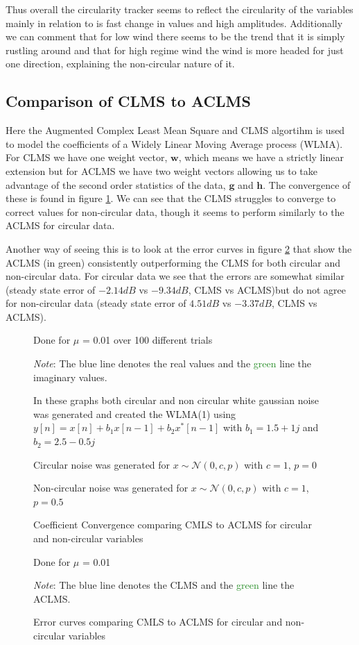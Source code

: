 \documentclass[10pt,twoside,a4paper]{report}
\begin{document}
Thus overall the circularity tracker seems to reflect the circularity of the variables mainly in relation to is fast change in values and high amplitudes. Additionally we can comment that for low wind there seems to be the trend that it is simply rustling around and that for high regime wind the wind is more headed for just one direction, explaining the non-circular nature of it.
\FloatBarrier
\subsection{Comparison of CLMS to ACLMS}
Here the Augmented Complex Least Mean Square and CLMS algortihm is used to model the coefficients of a Widely Linear Moving Average process (WLMA). For CLMS we have one weight vector, $\mathbf{w}$, which means we have a strictly linear extension but for ACLMS we have two weight vectors allowing us to take advantage of the second order statistics of the data, $\mathbf{g}$ and $\mathbf{h}$. The convergence of these is found in figure \ref{fig:4_2f_2}. We can see that the CLMS struggles to converge to correct values for non-circular data, though it seems to perform similarly to the ACLMS for circular data.

Another way of seeing this is to look at the error curves in figure \ref{fig:4_2f_1} that show the ACLMS (in green) consistently outperforming the CLMS for both circular and non-circular data. For circular data we see that the errors are somewhat similar (steady state error of $-2.14dB$ vs $-9.34dB$, CLMS vs ACLMS)but do not agree for non-circular data (steady state error of $4.51dB$ vs $-3.37dB$, CLMS vs ACLMS).

\begin{figure}[h]
\centering
\resizebox{\textwidth}{!}{}
\resizebox{\textwidth}{!}{}
Done for $\mu$ = 0.01  over 100 different trials

\justifying

\textit{Note}: The \textcolor{NavyBlue}{blue} line denotes the real values and the \textcolor{ForestGreen}{green} line the imaginary values.

In these graphs both circular and non circular white gaussian noise was generated and created the WLMA(1) using $y[n]=x[n]+b_1x[n-1]+b_2x^*[n-1]$ with $b_1=1.5+1j$ and $b_2 = 2.5-0.5j$

Circular noise was generated for $x\sim \mathcal{N}(0,c,p)$ with $c=1$, $p=0$

Non-circular noise was generated for $x\sim \mathcal{N}(0,c,p)$ with $c=1$, $p=0.5$
\caption{Coefficient Convergence comparing CMLS to ACLMS for circular and non-circular variables}
\label{fig:4_2f_2}
\end{figure}
\begin{figure}[h]
\centering
\resizebox{\textwidth}{!}{}
Done for $\mu$ = 0.01 

\justifying

\textit{Note}: The \textcolor{NavyBlue}{blue} line denotes the CLMS and the \textcolor{ForestGreen}{green} line the ACLMS.


\caption{Error curves comparing CMLS to ACLMS for circular and non-circular variables}
\label{fig:4_2f_1}
\end{figure}
\clearpage
\FloatBarrier
\end{document}

